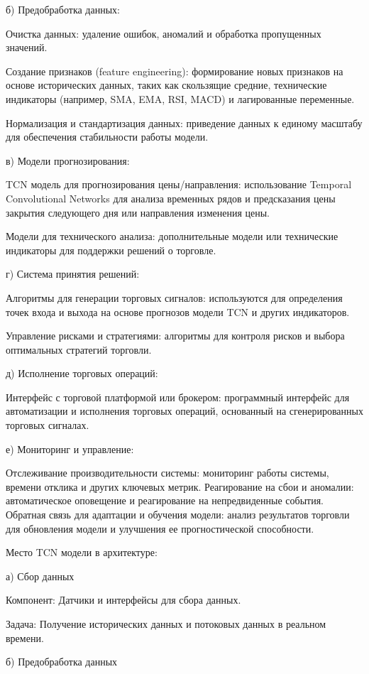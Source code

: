 б) Предобработка данных:

Очистка данных: удаление ошибок, аномалий и обработка пропущенных значений.

Создание признаков (feature engineering): формирование новых признаков на основе исторических данных, таких как скользящие средние, технические индикаторы (например, SMA, EMA, RSI, MACD) и лагированные переменные.

Нормализация и стандартизация данных: приведение данных к единому масштабу для обеспечения стабильности работы модели.

в) Модели прогнозирования:

TCN модель для прогнозирования цены/направления: использование Temporal Convolutional Networks для анализа временных рядов и предсказания цены закрытия следующего дня или направления изменения цены.

Модели для технического анализа: дополнительные модели или технические индикаторы для поддержки решений о торговле.

г) Система принятия решений:

Алгоритмы для генерации торговых сигналов: используются для определения точек входа и выхода на основе прогнозов модели TCN и других индикаторов.

Управление рисками и стратегиями: алгоритмы для контроля рисков и выбора оптимальных стратегий торговли.

д) Исполнение торговых операций:

Интерфейс с торговой платформой или брокером: программный интерфейс для автоматизации и исполнения торговых операций, основанный на сгенерированных торговых сигналах.

е) Мониторинг и управление:

Отслеживание производительности системы: мониторинг работы системы, времени отклика и других ключевых метрик.
Реагирование на сбои и аномалии: автоматическое оповещение и реагирование на непредвиденные события.
Обратная связь для адаптации и обучения модели: анализ результатов торговли для обновления модели и улучшения ее прогностической способности.

Место TCN модели в архитектуре:

а) Сбор данных

Компонент: Датчики и интерфейсы для сбора данных.

Задача: Получение исторических данных и потоковых данных в реальном времени.

б) Предобработка данных

